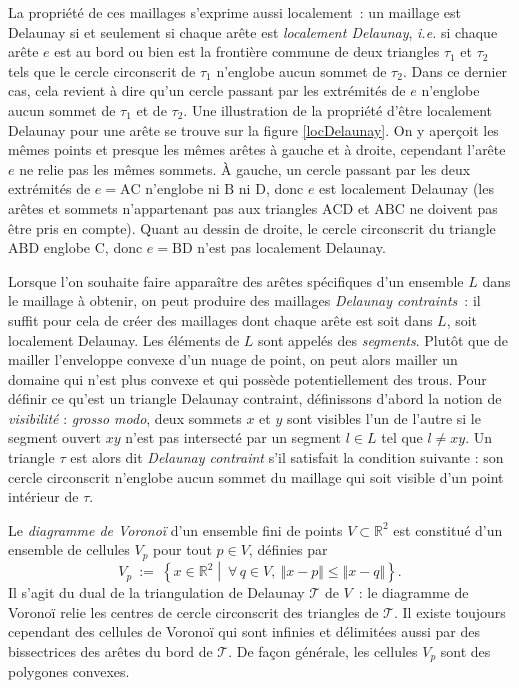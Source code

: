 \documentclass[12pt,a4paper]{report}
\begin{document}
La propriété de ces maillages s'exprime aussi localement~: un maillage est Delaunay si et seulement si chaque arête est \emph{localement Delaunay}, \emph{i.e.} si chaque arête $e$ est au bord ou bien est la frontière commune de deux triangles $\tau_1$ et $\tau_2$ tels que le cercle circonscrit de $\tau_1$ n'englobe aucun sommet de $\tau_2$. Dans ce dernier cas, cela revient à dire qu'un cercle passant par les extrémités de $e$ n'englobe aucun sommet de $\tau_1$ et de $\tau_2$.
Une illustration de la propriété d'être localement Delaunay pour une arête se trouve sur la figure \ref{locDelaunay}. On y aperçoit les mêmes points et presque les mêmes arêtes à gauche et à droite, cependant l'arête $e$ ne relie pas les mêmes sommets. \`A gauche, un cercle passant par les deux extrémités de $e=\mathrm{AC}$ n'englobe ni $\mathrm{B}$ ni $\mathrm{D}$, donc $e$ est localement Delaunay (les arêtes et sommets n'appartenant pas aux triangles $\mathrm{ACD}$ et $\mathrm{ABC}$ ne doivent pas être pris en compte). Quant au dessin de droite, le cercle circonscrit du triangle $\mathrm{ABD}$ englobe $\mathrm{C}$, donc $e=\mathrm{BD}$ n'est pas localement Delaunay.

Lorsque l'on souhaite faire apparaître des arêtes spécifiques d'un ensemble $L$ dans le maillage à obtenir, on peut produire des maillages \emph{Delaunay contraints}~: il suffit pour cela de créer des maillages dont chaque arête est soit dans $L$, soit localement Delaunay. Les éléments de $L$ sont appelés des \emph{segments}. Plutôt que de mailler l'enveloppe convexe d'un nuage de point, on peut alors mailler un domaine qui n'est plus convexe et qui possède potentiellement des trous.
Pour définir ce qu'est un triangle Delaunay contraint, définissons d'abord la notion de \emph{visibilité} : \emph{grosso modo}, deux sommets $x$ et $y$ sont visibles l'un de l'autre si le segment ouvert $xy$ n'est pas intersecté par un segment $l\in L$ tel que $l\neq xy$.
Un triangle $\tau$ est alors dit \emph{Delaunay contraint} s'il satisfait la condition suivante : son cercle circonscrit n'englobe aucun sommet du maillage qui soit visible d'un point intérieur de $\tau$.
\vspace{1cm}

Le \emph{diagramme de Voronoï} d'un ensemble fini de points $V\subset\mathbb{R}^2$ est constitué d'un ensemble de cellules $V_p$ pour tout $p\in V$, définies par
\[V_p\ :=\ \left\{x\in\mathbb{R}^2\middle\vert\ \forall\,q\in V,\ \Vert x-p\Vert\leqslant\Vert x-q\Vert\right\}\text{.}\]
Il s'agit du dual de la triangulation de Delaunay $\mathcal{T}$ de $V$~: le diagramme de Voronoï relie les centres de cercle circonscrit des triangles de $\mathcal{T}$. Il existe toujours cependant des cellules de Voronoï qui sont infinies et délimitées aussi par des bissectrices des arêtes du bord de $\mathcal{T}$. De façon générale, les cellules $V_p$ sont des polygones convexes.
\end{document}
